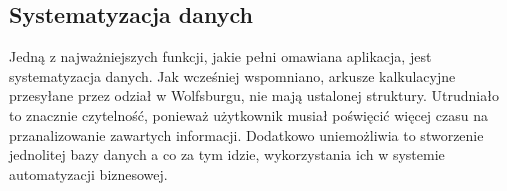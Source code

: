 \subsection{Systematyzacja danych}
Jedną z najważniejszych funkcji, jakie pełni omawiana aplikacja, jest systematyzacja danych. Jak wcześniej wspomniano, arkusze kalkulacyjne przesyłane przez odział w Wolfsburgu, nie mają ustalonej struktury. Utrudniało to znacznie czytelność, ponieważ użytkownik musiał poświęcić więcej czasu na przanalizowanie zawartych informacji. Dodatkowo uniemożliwia to stworzenie jednolitej bazy danych a co za tym idzie, wykorzystania ich w systemie automatyzacji biznesowej.